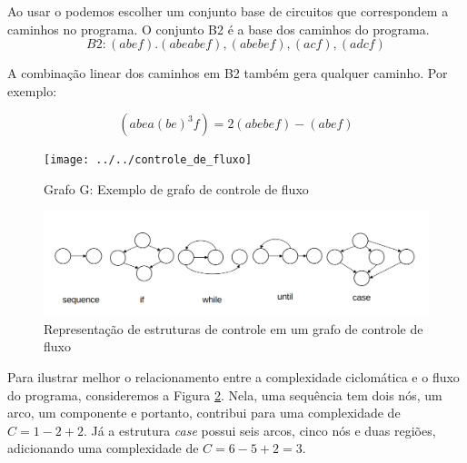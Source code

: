 Ao usar o  podemos escolher um conjunto base de circuitos que correspondem a caminhos no programa. O conjunto B2 é a base dos caminhos do programa.
\[B2: (abef).(abeabef),(abebef),(acf),(adcf)\]

A combinação linear dos caminhos em B2 também gera qualquer caminho. Por exemplo:

\[(abea(be)^3f) = 2(abebef) - (abef)\]


\begin{figure}
	\centering
	\texttt{[image: ../../controle\_de\_fluxo]}
	\caption{Grafo G: Exemplo de grafo de controle de fluxo}
	\label{fig:grafo-de-controle-de-fluxo}
\end{figure}
\begin{figure}
	\centering
	\includegraphics[width=0.5\linewidth]{figure/fluxo_estruturas}
	\caption{Representação de estruturas de controle em um grafo de controle de fluxo}
	\label{fig:fluxoestruturas}
\end{figure}

Para ilustrar melhor o relacionamento entre a complexidade ciclomática e o fluxo do programa, consideremos a Figura \ref{fig:fluxoestruturas}. Nela, uma sequência tem dois nós, um arco, um componente e portanto, contribui para uma complexidade de $C = 1 - 2 + 2$. Já a estrutura \textit{case} possui seis arcos, cinco nós e duas regiões, adicionando uma complexidade de $C = 6 - 5 + 2 = 3$.



